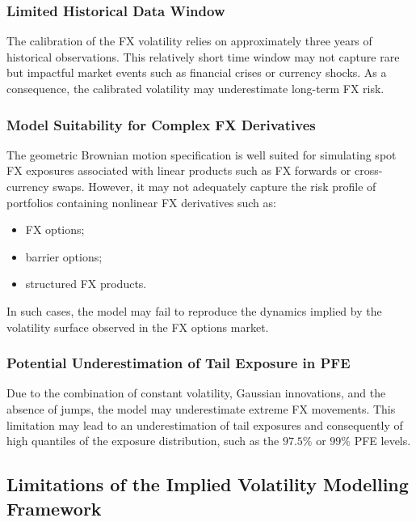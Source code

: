 \subsubsection{Limited Historical Data Window}

The calibration of the FX volatility relies on approximately three years of historical observations. This relatively short time window may not capture rare but impactful market events such as financial crises or currency shocks. As a consequence, the calibrated volatility may underestimate long-term FX risk.


\subsubsection{Model Suitability for Complex FX Derivatives}

The geometric Brownian motion specification is well suited for simulating spot FX exposures associated with linear products such as FX forwards or cross-currency swaps. However, it may not adequately capture the risk profile of portfolios containing nonlinear FX derivatives such as:

\begin{itemize}
	\item FX options;
	\item barrier options;
	\item structured FX products.
\end{itemize}

In such cases, the model may fail to reproduce the dynamics implied by the volatility surface observed in the FX options market.

\subsubsection{Potential Underestimation of Tail Exposure in PFE}

Due to the combination of constant volatility, Gaussian innovations, and the absence of jumps, the model may underestimate extreme FX movements. This limitation may lead to an underestimation of tail exposures and consequently of high quantiles of the exposure distribution, such as the $97.5\%$ or $99\%$ PFE levels.



\newpage 

\subsection{Limitations of the Implied Volatility Modelling Framework}

